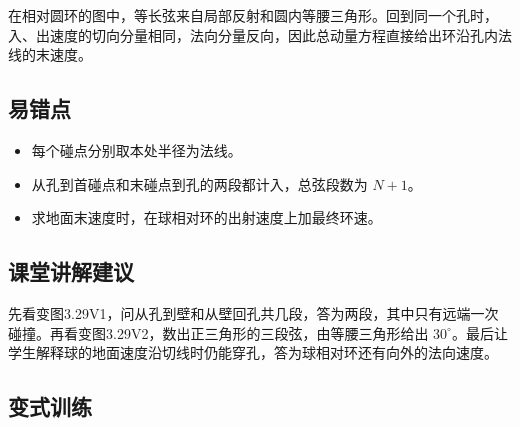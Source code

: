 \documentclass[UTF8,fontset=fandol,a4paper,11pt]{ctexart}
\begin{document}
在相对圆环的图中，等长弦来自局部反射和圆内等腰三角形。回到同一个孔时，入、出速度的切向分量相同，法向分量反向，因此总动量方程直接给出环沿孔内法线的末速度。



\subsection*{易错点}

\begin{itemize}
\item 每个碰点分别取本处半径为法线。
\item 从孔到首碰点和末碰点到孔的两段都计入，总弦段数为 $N+1$。
\item 求地面末速度时，在球相对环的出射速度上加最终环速。
\end{itemize}



\subsection*{课堂讲解建议}

先看变图3.29V1，问从孔到壁和从壁回孔共几段，答为两段，其中只有远端一次碰撞。再看变图3.29V2，数出正三角形的三段弦，由等腰三角形给出 $30^\circ$。最后让学生解释球的地面速度沿切线时仍能穿孔，答为球相对环还有向外的法向速度。



\subsection*{变式训练}
\end{document}
